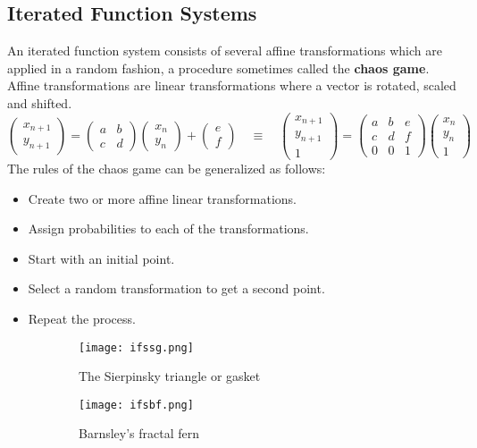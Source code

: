 \subsection{Iterated Function Systems}
An iterated function system consists of several affine transformations which are applied in a random fashion, a procedure sometimes called the \textbf{chaos game}.\\
Affine transformations are linear transformations where a vector is rotated, scaled and shifted.
\begin{equation}
	\begin{pmatrix}
		x_{n+1}\\y_{n+1}
	\end{pmatrix}=
	\begin{pmatrix}
		a&b\\c&d
	\end{pmatrix}
	\begin{pmatrix}
		x_n\\y_n
	\end{pmatrix}+
	\begin{pmatrix}
		e\\f
	\end{pmatrix}\quad\equiv\quad
	\begin{pmatrix}
		x_{n+1}\\y_{n+1}\\1
	\end{pmatrix}=
	\begin{pmatrix}
		a&b&e\\c&d&f\\0&0&1
	\end{pmatrix}
	\begin{pmatrix}
		x_n\\y_n\\1
	\end{pmatrix}
\end{equation}
The rules of the chaos game can be generalized as follows:
\begin{itemize}
	\item Create two or more affine linear transformations.
	\item Assign probabilities to each of the transformations.
	\item Start with an initial point.
	\item Select a random transformation to get a second point.
	\item Repeat the process.
\end{itemize}
\begin{figure}[h!]
	\centering
	\begin{subfigure}{0.45\linewidth}
		\centering
		\texttt{[image: ifssg.png]}
		\caption{The Sierpinsky triangle or gasket}
		\label{fig:ifssg}
	\end{subfigure}
	\vline
	\begin{subfigure}{0.4\linewidth}
		\centering
		\texttt{[image: ifsbf.png]}
		\caption{Barnsley’s fractal fern}
		\label{fig:ifsbf}
	\end{subfigure}
	\caption{}
\end{figure}
